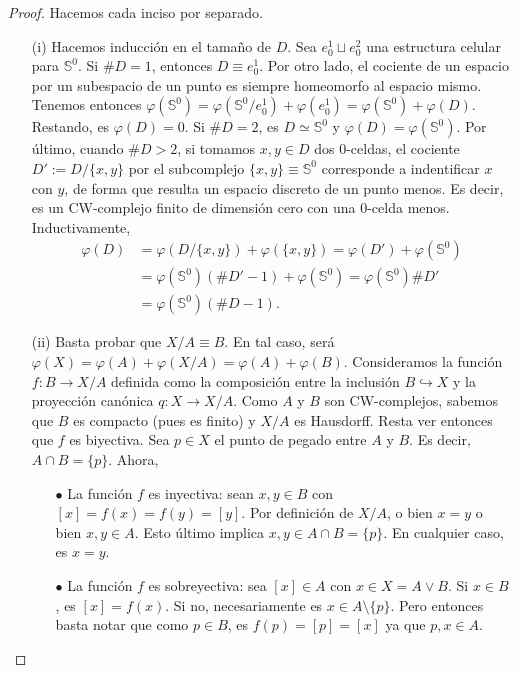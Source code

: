 \documentclass[11pt]{article}
\newcommand{\Ss}{\mathbb{S}}
\begin{document}
\begin{proof} Hacemos cada inciso por separado.
\begin{itemize}
\item[(i)] Hacemos inducci\'on en el tama\~{n}o de $D$. Sea $e^1_0 \sqcup e^2_0$ una estructura celular para $\Ss^0$. Si $\# D=1$, entonces $D \equiv e^1_0$. Por otro lado, el cociente de un espacio por un subespacio de un punto es siempre homeomorfo al espacio mismo. Tenemos entonces $\varphi(\Ss^0) = \varphi(\Ss^0/e^1_0) + \varphi(e^1_0) = \varphi(\Ss^0) + \varphi(D)$. Restando, es $\varphi(D) = 0$. Si $\# D = 2$, es $D \simeq \Ss^0$ y $\varphi(D) = \varphi(\Ss^0)$. Por \'ultimo, cuando $\#D > 2$, si tomamos $x,y \in D$ dos $0$-celdas, el cociente $D' := D/\{x,y\}$ por el subcomplejo $\{x,y\} \equiv \Ss^0$ corresponde a indentificar $x$ con $y$, de forma que resulta un espacio discreto de un punto menos. Es decir, es un CW-complejo finito de dimensi\'on cero con una $0$-celda menos. Inductivamente, 
\begin{align*}
\varphi(D) &= \varphi(D/\{x,y\}) + \varphi(\{x,y\}) = \varphi(D') + \varphi(\Ss^0) \\
&= \varphi(\Ss^0)(\# D'-1) + \varphi(\Ss^0) = \varphi(\Ss^0)\# D'\\
&= \varphi(\Ss^0)(\# D-1).
\end{align*}
\item[(ii)] Basta probar que $X/A \equiv B$. En tal caso, ser\'a $\varphi(X) = \varphi(A) + \varphi(X/A) = \varphi(A) + \varphi(B)$. Consideramos la funci\'on $f : B \to X/A$ definida como la composici\'on entre la inclusi\'on $B \hookrightarrow X$ y la proyecci\'on can\'onica $q : X \to X/A$. Como $A$ y $B$ son CW-complejos, sabemos que $B$ es compacto (pues es finito) y $X/A$ es Hausdorff. Resta ver entonces que $f$ es biyectiva. Sea $p \in X$ el punto de pegado entre $A$ y $B$. Es decir, $A \cap B = \{p\}$. Ahora,
\begin{itemize}
\item[$\bullet$] La funci\'on $f$ es inyectiva: sean $x, y \in B$ con $[x] = f(x) = f(y) = [y]$. Por definici\'on de $X/A$, o bien $x = y$ o bien $x,y \in A$. Esto \'ultimo implica $x,y \in A \cap B = \{p\}$. En cualquier caso, es $x = y$.
\item[$\bullet$] La funci\'on $f$ es sobreyectiva: sea $[x] \in A$ con $x \in X = A \vee B$. Si $x \in B$, es $[x] = f(x)$. Si no, necesariamente es $x \in A \setminus \{p\}$. Pero entonces basta notar que como $p \in B$, es $f(p) = [p] = [x]$ ya que $p,x \in A$.
\end{itemize}

\end{itemize}
\end{proof}
\end{document}
